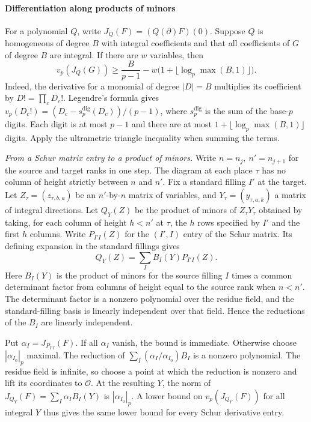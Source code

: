 \paragraph{Differentiation along products of minors}
For a polynomial \(Q\), write \(J_Q(F)=(Q(\partial)F)(0)\).
Suppose \(Q\) is homogeneous of degree \(B\) with integral coefficients and
that all coefficients of \(G\) of degree \(B\) are integral.
If there are \(w\) variables, then
\begin{equation}\label{eq:upper-legendre}
  v_p(J_Q(G))\ge
  \frac{B}{p-1}-w\bigl(1+\lfloor\log_p\max(B,1)\rfloor\bigr).
\end{equation}
Indeed, the derivative for a monomial of degree \(|D|=B\) multiplies
its coefficient by \(D!=\prod_c D_c!\). Legendre's formula gives
\(v_p(D_c!)=(D_c-s_p^{\mathrm{dig}}(D_c))/(p-1)\), where
\(s_p^{\mathrm{dig}}\) is the sum of the base-\(p\) digits.
Each digit is at most \(p-1\) and there are at most
\(1+\lfloor\log_p\max(B,1)\rfloor\) digits. Apply the ultrametric
triangle inequality when summing the terms.

\emph{From a Schur matrix entry to a product of minors.}
Write \(n=n_j,\ n'=n_{j+1}\) for the source and target ranks in one step.
The diagram at each place \(\tau\) has no column of height strictly between
\(n\) and \(n'\). Fix a standard filling \(I'\) at the target. Let
\(Z_\tau=(z_{\tau,b,a})\) be an \(n'\)-by-\(n\) matrix of variables,
and \(Y_\tau=(y_{\tau,a,k})\) a matrix of integral directions.
Let \(Q_Y(Z)\) be the product of minors of \(Z_\tau Y_\tau\) obtained
by taking, for each column of height \(h<n'\) at \(\tau\), the \(h\) rows
specified by \(I'\) and the first \(h\) columns.
Write \(P_{I'I}(Z)\) for the \((I',I)\) entry of the Schur matrix.
Its defining expansion in the standard fillings gives
\[
 Q_Y(Z)=\sum_I B_I(Y)P_{I'I}(Z).
\]
Here \(B_I(Y)\) is the product of minors for the source filling \(I\)
times a common determinant factor from columns of height equal to
the source rank when \(n<n'\). The determinant factor is a nonzero
polynomial over the residue field, and the standard-filling basis
is linearly independent over that field. Hence the reductions of the
\(B_I\) are linearly independent.

Put \(\alpha_I=J_{P_{I'I}}(F)\). If all \(\alpha_I\) vanish, the bound is
immediate. Otherwise choose \(|\alpha_{I_0}|_p\) maximal. The reduction
of \(\sum_I(\alpha_I/\alpha_{I_0})B_I\) is a nonzero polynomial.
The residue field is infinite, so choose a point at which the reduction
is nonzero and lift its coordinates to \(\mathcal O\).
At the resulting \(Y\), the norm of
\(J_{Q_Y}(F)=\sum_I\alpha_I B_I(Y)\) is \(|\alpha_{I_0}|_p\).
A lower bound on \(v_p(J_{Q_Y}(F))\) for all integral \(Y\) thus
gives the same lower bound for every Schur derivative entry.

